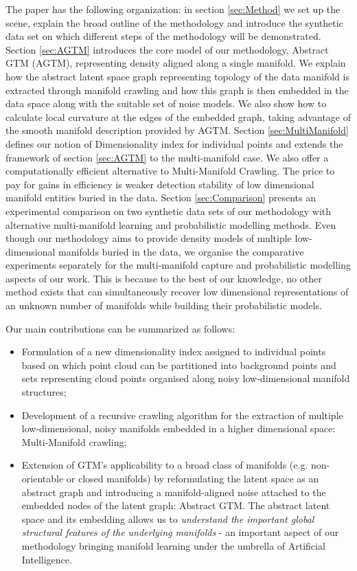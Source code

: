 The paper has the following organization: in section \ref{sec:Method} we set up the scene, explain the broad outline of the methodology and introduce the synthetic data set on which different steps of the methodology  will be demonstrated. Section \ref{sec:AGTM} 
introduces the core model of our methodology, Abstract GTM (AGTM), representing density aligned along a single manifold. We explain how the abstract latent space graph representing topology of the data manifold is extracted through manifold crawling and how this graph is then embedded in the data space along with the suitable set of noise models. We also show how to calculate local curvature at the edges of the embedded graph, taking advantage of the smooth manifold description provided by AGTM.
 Section \ref{sec:MultiManifold} defines our notion of Dimensionality index for individual points and extends the framework of section \ref{sec:AGTM} to the multi-manifold case. We also offer a computationally efficient alternative to Multi-Manifold Crawling. The price to pay for gains in efficiency is weaker detection stability of low dimensional manifold entities buried in the data.
 Section \ref{sec:Comparison} presents an experimental comparison on two synthetic data sets of our methodology with alternative multi-manifold learning and probabilistic modelling methods. Even though our methodology aims to provide density models of multiple low-dimensional manifolds buried in the data, we organise the comparative experiments separately for the multi-manifold capture and probabilistic modelling aspects of our work. This is because to the best of our knowledge, no other method exists that can simultaneously recover low dimensional representations of an unknown number of manifolds while building their probabilistic models.
 
 
Our main contributions can be summarized as follows:
\begin{itemize}
    \item Formulation of a new dimensionality index assigned to individual points based on which point cloud can be partitioned into background points and sets representing cloud points organised along noisy low-dimensional manifold structures;
    \item Development of a recursive crawling algorithm for the extraction of multiple low-dimensional, noisy manifolds embedded in a higher dimensional space: Multi-Manifold crawling;
    \item Extension of GTM's applicability to a broad class of manifolds (e.g. non-orientable or closed manifolds) by reformulating the latent space as an abstract graph and introducing a manifold-aligned noise attached to the embedded nodes of the latent graph: Abstract GTM. The abstract latent space and its embedding allows us to {\em understand the important global structural features of the underlying manifolds} - an important aspect of our methodology bringing manifold learning under the umbrella of Artificial Intelligence.

\end{itemize}

